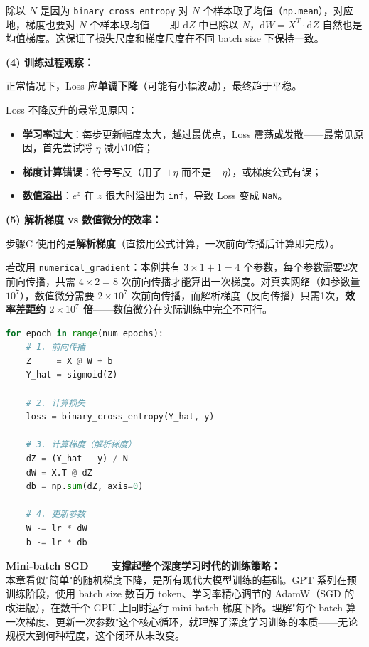 \documentclass[a4paper,11pt]{ctexart}
\begin{document}
\begin{solutionbox}[参考答案与详细解析]
    除以 $N$ 是因为 \texttt{binary\_cross\_entropy} 对 $N$ 个样本取了均值（\texttt{np.mean}），对应地，梯度也要对 $N$ 个样本取均值——即 $\mathrm{d}Z$ 中已除以 $N$，$\mathrm{d}W = X^T \cdot \mathrm{d}Z$ 自然也是均值梯度。这保证了损失尺度和梯度尺度在不同 batch size 下保持一致。

    \textbf{(4) 训练过程观察：}

    正常情况下，Loss 应\textbf{单调下降}（可能有小幅波动），最终趋于平稳。

    Loss 不降反升的最常见原因：
    \begin{itemize}
        \item \textbf{学习率过大}：每步更新幅度太大，越过最优点，Loss 震荡或发散——最常见原因，首先尝试将 $\eta$ 减小10倍；
        \item \textbf{梯度计算错误}：符号写反（用了 $+\eta$ 而不是 $-\eta$），或梯度公式有误；
        \item \textbf{数值溢出}：$e^z$ 在 $z$ 很大时溢出为 \texttt{inf}，导致 Loss 变成 \texttt{NaN}。
    \end{itemize}

    \textbf{(5) 解析梯度 vs 数值微分的效率：}

    步骤C 使用的是\textbf{解析梯度}（直接用公式计算，一次前向传播后计算即完成）。

    若改用 \texttt{numerical\_gradient}：本例共有 $3\times1 + 1 = 4$ 个参数，每个参数需要2次前向传播，共需 $4 \times 2 = 8$ 次前向传播才能算出一次梯度。对真实网络（如参数量 $10^7$），数值微分需要 $2\times10^7$ 次前向传播，而解析梯度（反向传播）只需1次，\textbf{效率差距约 $2\times10^7$ 倍}——数值微分在实际训练中完全不可行。

    \begin{keybox}
        \begin{lstlisting}[language=Python]
for epoch in range(num_epochs):
    # 1. 前向传播
    Z     = X @ W + b
    Y_hat = sigmoid(Z)

    # 2. 计算损失
    loss = binary_cross_entropy(Y_hat, y)

    # 3. 计算梯度（解析梯度）
    dZ = (Y_hat - y) / N
    dW = X.T @ dZ
    db = np.sum(dZ, axis=0)

    # 4. 更新参数
    W -= lr * dW
    b -= lr * db
        \end{lstlisting}
    \end{keybox}
\end{solutionbox}

\begin{appbox}[现实应用场景]
    \textbf{Mini-batch SGD——支撑起整个深度学习时代的训练策略：}\\
    本章看似"简单"的随机梯度下降，是所有现代大模型训练的基础。GPT 系列在预训练阶段，使用 batch size 数百万 token、学习率精心调节的 AdamW（SGD 的改进版），在数千个 GPU 上同时运行 mini-batch 梯度下降。理解"每个 batch 算一次梯度、更新一次参数"这个核心循环，就理解了深度学习训练的本质——无论规模大到何种程度，这个闭环从未改变。
\end{appbox}
\end{document}
